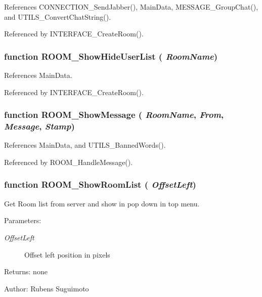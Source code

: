 References CONNECTION\_\-SendJabber(), MainData, MESSAGE\_\-GroupChat(), and UTILS\_\-ConvertChatString().

Referenced by INTERFACE\_\-CreateRoom().
\subsubsection[ROOM\_\-ShowHideUserList]{\setlength{\rightskip}{0pt plus 5cm}function ROOM\_\-ShowHideUserList ( {\em RoomName})}\label{room_2room_8js_4817018eb9852a0bdb1e6cb4e3d254ec}




References MainData.

Referenced by INTERFACE\_\-CreateRoom().
\subsubsection[ROOM\_\-ShowMessage]{\setlength{\rightskip}{0pt plus 5cm}function ROOM\_\-ShowMessage ( {\em RoomName}, \/   {\em From}, \/   {\em Message}, \/   {\em Stamp})}\label{room_2room_8js_2f5da06839d0aeb9fc8f30ceb1009dfb}




References MainData, and UTILS\_\-BannedWords().

Referenced by ROOM\_\-HandleMessage().
\subsubsection[ROOM\_\-ShowRoomList]{\setlength{\rightskip}{0pt plus 5cm}function ROOM\_\-ShowRoomList ( {\em OffsetLeft})}\label{room_2room_8js_99678e0a267a2fa6853fe401b4b8be73}


Get Room list from server and show in pop down in top menu. 

\begin{Desc}
\item[Parameters:]
\begin{description}
\item[{\em OffsetLeft}]Offset left position in pixels \end{description}
\end{Desc}
\begin{Desc}
\item[Returns:]none \end{Desc}
\begin{Desc}
\item[Author:]Rubens Suguimoto \end{Desc}


